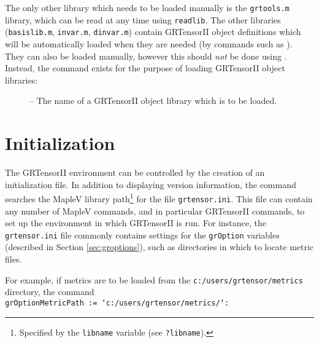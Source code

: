 \documentclass{article}
\begin{document}
The only other library which needs to be loaded manually is the
\texttt{grtools.m} library, which can be read at any time using
\texttt{readlib}. The other libraries (\texttt{basislib.m},
\texttt{invar.m}, \texttt{dinvar.m}) contain GRTensorII object
definitions which will be automatically loaded when they are needed
(by commands such as %
). They can also be loaded manually, however this should
\textit{not} be done using . Instead, the command
 exists for the purpose of loading GRTensorII object
libraries:\\
\begin{cmdspec}
  \label{spec:grlib}

  \begin{description}
    \item[] -- The name of a GRTensorII object library
      which is to be loaded.
  \end{description}

\end{cmdspec}
%
\section{Initialization} \label{sec:init}
%
The GRTensorII environment can be controlled by the creation of an
initialization file. In addition to displaying version information,
the command \label{spec:grtensor} searches the MapleV
library path\footnote{Specified by the \texttt{libname} variable (see
\texttt{?libname}).} for the file \texttt{grtensor.ini}. This file can
contain any number of MapleV commands, and in particular GRTensorII
commands, to set up the environment in which GRTensorII is run. For
instance, the \texttt{grtensor.ini} file commonly contains settings
for the \texttt{grOption} variables (described in Section
\ref{sec:groptions}), such as directories in which to locate metric
files.

For example, if metrics are to be loaded from the 
\texttt{c:/users/grtensor/metrics} directory, the command\\

\noindent\texttt{grOptionMetricPath := `c:/users/grtensor/metrics/`:}\\
\end{document}
